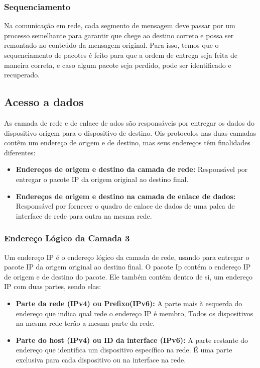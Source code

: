 \documentclass[12pt a4paper]{paper}
\begin{document}
\subsubsection{Sequenciamento} %
\label{sec:Sequenciamento}
Na comunicação em rede, cada segmento de mensagem deve passar por um processo 
semelhante para garantir que chege ao destino correto e possa ser remontado no 
conteúdo da mensagem original. Para isso, temos que o sequenciamento de pacotes
é feito para que a ordem de entrega seja feita de maneira correta, e caso algum 
pacote seja perdido, pode ser identificado e recuperado.


\subsection{Acesso a dados} %
\label{sub: Acesso a dados}
As camada de rede e de enlace de ados são responsáveis por entregar os dados do 
dispositivo origem para o dispositivo de destino. Ois protocolos nas duas camadas 
contêm um endereço de origem e de destino, mas seus endereços têm finalidades 
diferentes:

\begin{itemize}
  \item \textbf{Endereços de origem e destino da camada de rede: } Responsável por entregar o pacote IP da origem original ao destino final.
  \item \textbf{Endereços de origem e destino na camada de enlace de dados: } Responsável por fornecer o quadro de enlace de dados de uma palca de interface de rede para outra na mesma rede.
\end{itemize}

\subsubsection{Endereço Lógico da Camada 3} %
\label{sec:Endereço Lógico da Camada 3}
Um endereço IP é o endereço lógico da camada de rede, usando para entregar o pacote IP 
da origem original ao destino final. O pacote Ip contém o endereço IP de origem e de 
destino do pacote. Ele também contém dentro de si, um endereço IP com duas partes, sendo elas: 

\begin{itemize}
  \item \textbf{Parte da rede (IPv4) ou Prefixo(IPv6): }A parte mais à esquerda do endereço que indica qual rede o endereço IP é membro, Todos os dispositivos na mesma rede terão a mesma parte da rede.
  \item \textbf{Parte do host (IPv4) ou ID da interface (IPv6): } A parte restante do endereço que identifica um dispositivo específico na rede. É uma parte exclusiva para cada dispositivo ou na interface na rede.
\end{itemize}












  
\end{document}
